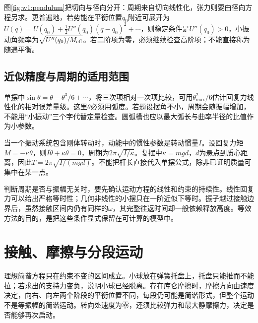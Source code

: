 
图\ref{fig:w1:pendulum}把切向与径向分开：周期来自切向线性化，张力则要由径向方程另求。更普遍地，若势能在平衡位置$q_0$附近可展开为$U(q)=U(q_0)+\frac12U''(q_0)(q-q_0)^2+\cdots$，则稳定条件是$U''(q_0)>0$，小振动角频率为$\sqrt{U''(q_0)/M_{\rm eff}}$。若二阶项为零，必须继续检查高阶项；不能直接称为随遇平衡。

\subsection{近似精度与周期的适用范围}
单摆中$\sin\theta=\theta-\theta^3/6+\cdots$，将三次项相对一次项比较，可用$\theta_{\max}^2/6$估计回复力线性化的相对误差量级。这里$\theta$必须用弧度。若题设摆角不小，周期会随振幅增加，不能用“小振动”三个字代替定量检查。圆弧槽也应以最大弧长与曲率半径的比值作为小参数。

当一个振动系统包含刚体转动时，动能中的惯性参数是转动惯量$I$。设回复力矩$M=-\kappa\theta$，则$I\ddot\theta+\kappa\theta=0$，周期为$2\pi\sqrt{I/\kappa}$。复摆中$\kappa=mgd$，$d$为悬点到质心距离，因此$T=2\pi\sqrt{I/(mgd)}$。不能把杆长直接代入单摆公式，除非已证明质量可集中在某一点。

判断周期是否与振幅无关时，要先确认运动方程的线性和约束的持续性。线性回复力可以给出严格等时性；几何非线性的小摆只在一阶近似下等时。振子越过接触边界后，虽然接触区间内仍有同样的$\omega$，其完整往返时间却一般依赖释放高度。等效方法的目的，是把这些条件显式保留在可计算的模型中。


\section{接触、摩擦与分段运动}
理想简谐方程只在约束不变的区间成立。小球放在弹簧托盘上，托盘只能推而不能拉；若求出的支持力变负，说明小球已经脱离。存在库仑摩擦时，摩擦方向由速度决定，向右、向左两个阶段的平衡位置不同，每段仍可能是简谐形式，但整个运动不是等振幅的简谐运动。转向处速度为零，还须比较弹力和最大静摩擦力，决定是否能够再次启动。

